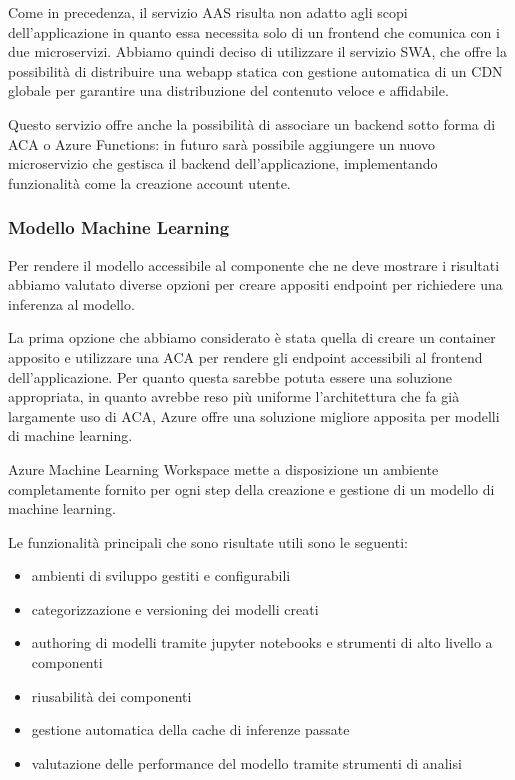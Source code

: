 Come in precedenza, il servizio AAS risulta non adatto agli scopi dell'applicazione in quanto essa necessita solo di un frontend che comunica con i due microservizi. Abbiamo quindi deciso di utilizzare il servizio SWA, che offre la possibilità di distribuire una webapp statica con gestione automatica di un CDN globale per garantire una distribuzione del contenuto veloce e affidabile.

Questo servizio offre anche la possibilità di associare un backend sotto forma di ACA o Azure Functions: in futuro sarà possibile aggiungere un nuovo microservizio che gestisca il backend dell'applicazione, implementando funzionalità come la creazione account utente.

\subsubsection{Modello Machine Learning}
Per rendere il modello accessibile al componente che ne deve mostrare i risultati abbiamo valutato diverse opzioni per creare appositi endpoint per richiedere una inferenza al modello.

La prima opzione che abbiamo considerato è stata quella di creare un container apposito e utilizzare una ACA per rendere gli endpoint accessibili al frontend dell'applicazione. Per quanto questa sarebbe potuta essere una soluzione appropriata, in quanto avrebbe reso più uniforme l'architettura che fa già largamente uso di ACA, Azure offre una soluzione migliore apposita per modelli di machine learning.

Azure Machine Learning Workspace mette a disposizione un ambiente completamente fornito per ogni step della creazione e gestione di un modello di machine learning.

Le funzionalità principali che sono risultate utili sono le seguenti:
\begin{itemize}
    \item ambienti di sviluppo gestiti e configurabili
    \item categorizzazione e versioning dei modelli creati
    \item authoring di modelli tramite jupyter notebooks e strumenti di alto livello a componenti
    \item riusabilità dei componenti
    \item gestione automatica della cache di inferenze passate
    \item valutazione delle performance del modello tramite strumenti di analisi
\end{itemize}

